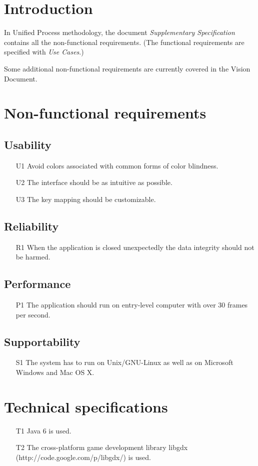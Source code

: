 \documentclass[fontsize=12pt,
               paper=a4,
               twoside=false,
               parskip=half,
               ]{scrartcl}
\begin{document}
\newcommand{\doctitle}{Supplementary Specification}


\tableofcontents

\section{Introduction}
In Unified Process methodology, the document \emph{Supplementary Specification} contains all the non-functional requirements. (The functional requirements are specified with \emph{Use Cases}.)

Some additional non-functional requirements are currently covered in the Vision Document.

\section{Non-functional requirements}

\subsection{Usability}
\begin{itemize}
	\item[U1] Avoid colors associated with common forms of color blindness.
	\item[U2] The interface should be as intuitive as possible.
	\item[U3] The key mapping should be customizable.
\end{itemize}

\subsection{Reliability}
\begin{itemize}
	\item[R1] When the application is closed unexpectedly the data integrity should not be harmed.
\end{itemize}

\subsection{Performance}
\begin{itemize}
	\item[P1] The application should run on entry-level computer with over 30 frames per second.
\end{itemize}

\subsection{Supportability}
\begin{itemize}
	\item[S1] The system has to run on Unix/GNU-Linux as well as on Microsoft Windows and Mac OS X.	
\end{itemize}

\section{Technical specifications}
\begin{itemize}
	\item[T1] Java 6 is used.
	\item[T2] The cross-platform game development library libgdx (http://code.google.com/p/libgdx/) is used. 
\end{itemize}
\end{document}
